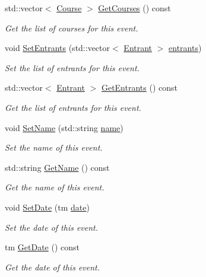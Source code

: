 \begin{DoxyCompactItemize}
std\-::vector$<$ \hyperlink{classCourse}{\-Course} $>$ \hyperlink{classEvent_a7fc2ac39ff5fc682762451b277c73d68}{\-Get\-Courses} () const 
\begin{DoxyCompactList}\small\item\em \-Get the list of courses for this event. \end{DoxyCompactList}\item 
void \hyperlink{classEvent_a11e2729e7676c2950dfc7cb56dbbea94}{\-Set\-Entrants} (std\-::vector$<$ \hyperlink{classEntrant}{\-Entrant} $>$ \hyperlink{classEvent_adede353249fa65a02148e7fcce077449}{entrants})
\begin{DoxyCompactList}\small\item\em \-Set the list of entrants for this event. \end{DoxyCompactList}\item 
std\-::vector$<$ \hyperlink{classEntrant}{\-Entrant} $>$ \hyperlink{classEvent_ab0232dfcc1b986cb2a79fef05b2d7efc}{\-Get\-Entrants} () const 
\begin{DoxyCompactList}\small\item\em \-Get the list of entrants for this event. \end{DoxyCompactList}\item 
void \hyperlink{classEvent_a2c91dbd3d7a2a3c31895d9f16a55f70e}{\-Set\-Name} (std\-::string \hyperlink{classEvent_ae116bf76fb01a92e000579a5a0d6f35c}{name})
\begin{DoxyCompactList}\small\item\em \-Set the name of this event. \end{DoxyCompactList}\item 
std\-::string \hyperlink{classEvent_af4202c6d2371029b117d37ba7cc12ae6}{\-Get\-Name} () const 
\begin{DoxyCompactList}\small\item\em \-Get the name of this event. \end{DoxyCompactList}\item 
void \hyperlink{classEvent_a5f606cada35150b7c9ad554f4252b53c}{\-Set\-Date} (tm \hyperlink{classEvent_a5df9ecce46e9db33b3b29b99156aa70a}{date})
\begin{DoxyCompactList}\small\item\em \-Set the date of this event. \end{DoxyCompactList}\item 
tm \hyperlink{classEvent_a0d3002c0e3961c360fa0f11412bf1e5c}{\-Get\-Date} () const 
\begin{DoxyCompactList}\small\item\em \-Get the date of this event. \end{DoxyCompactList}\item 

\end{DoxyCompactItemize}

